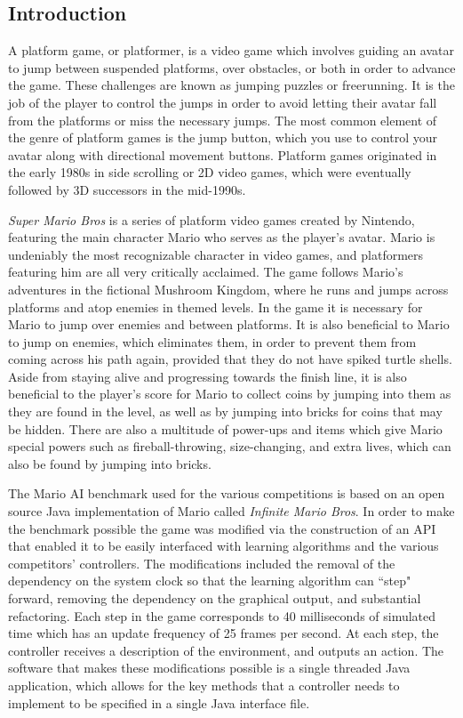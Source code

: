 \documentclass[12pt]{article}
\begin{document}
\setlength{\columnsep}{.65cm}
\begin{multicols}{2}
\section * {Introduction}
A platform game, or platformer, is a video game which involves guiding an avatar to jump between suspended 
platforms, over obstacles, or both in order to advance the game. These challenges are known as jumping puzzles 
or freerunning. It is the job of the player to control the jumps in order to avoid letting their avatar fall from the 
platforms or miss the necessary jumps. The most common element of the genre of platform games is the jump 
button, which you use to control your avatar along with directional movement buttons. Platform games originated in the early 1980s in side scrolling or 2D video games, which were eventually 
followed by 3D successors in the mid-1990s.

\textit {Super Mario Bros} is a series of platform video games created by Nintendo, featuring the main character Mario who 
serves as the player's avatar. 
Mario is undeniably the most recognizable character in video games, and platformers featuring him 
are all very critically acclaimed.  
The game follows Mario's adventures in the fictional Mushroom Kingdom, where he 
runs and jumps across platforms and atop enemies in themed levels. In the game it is necessary for Mario to jump 
over enemies and between platforms. It is also beneficial to Mario to jump on enemies, which eliminates them, in order to prevent them 
from coming across his path again, provided that they do not have spiked turtle shells. Aside from staying alive and 
progressing towards the finish line, it is also beneficial to the player's score for Mario to collect coins by jumping 
into them as they are found in the level, as well as by jumping into bricks for coins that may be hidden. There are 
also a multitude of power-ups and items which give Mario special powers such as fireball-throwing, size-changing, 
and extra lives, which can also be found by jumping into bricks.

The Mario AI benchmark used for the various competitions is based on an open source 
Java implementation of Mario called \textit{Infinite Mario Bros}.  
In order to make the benchmark possible the game was modified via the construction of an API that enabled it to be 
easily interfaced with learning algorithms and the various competitors' controllers. The modifications included the 
removal of the dependency on the system clock so that the learning algorithm can ``step" forward, removing the 
dependency on the graphical output, and substantial refactoring. Each step in the game corresponds to 40 
milliseconds of simulated time which has an update frequency of 25 frames per second. At each step, the controller 
receives a description of the environment, and outputs an action. The software that makes these modifications 
possible is a single threaded Java application, which allows for the key methods that a controller needs to 
implement to be specified in a single Java interface file.


\end{multicols}
\end{document}
